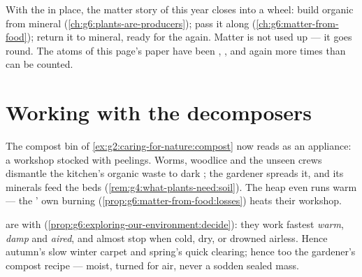 \begin{remark}\label{rem:g6:decomposers-and-soil:circle}
With the  in place, the matter story of this year
closes into a wheel:  build organic from mineral
(\cref{ch:g6:plants-are-producers});  pass it along
(\cref{ch:g6:matter-from-food});  return it to
mineral, ready for the  again. Matter is not used
up --- it goes round. The atoms of this page's paper have
been , ,  and  again more times than can be
counted.
\end{remark}

\section{Working with the decomposers}

\begin{example}\label{ex:g6:decomposers-and-soil:compost}
The compost bin of \cref{ex:g2:caring-for-nature:compost}
now reads as an appliance: a  workshop stocked
with peelings. Worms, woodlice and the unseen crews
dismantle the kitchen's organic waste to dark ; the
gardener spreads it, and its minerals feed the beds
(\cref{rem:g4:what-plants-need:soil}). The heap even runs
warm --- the ' own burning
(\cref{prop:g6:matter-from-food:losses}) heats their
workshop.
\end{example}

\begin{proposition}\label{prop:g6:decomposers-and-soil:speed}
 are  with 
(\cref{prop:g6:exploring-our-environment:decide}): they work
fastest \emph{warm}, \emph{damp} and \emph{aired}, and
almost stop when cold, dry, or drowned airless. Hence
autumn's slow winter carpet and spring's quick clearing;
hence too the gardener's compost recipe --- moist, turned
for air, never a sodden sealed mass.
\end{proposition}
\admitted

